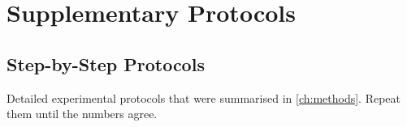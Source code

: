 
\chapter{Supplementary Protocols}
\label{app:protocols}

\section{Step-by-Step Protocols}

Detailed experimental protocols that were summarised in
\cref{ch:methods}. Repeat them until the numbers agree.
